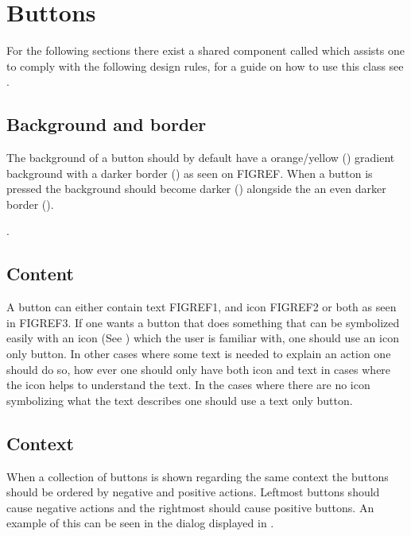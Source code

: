 
\chapter{Buttons}
\label{cha:buttons}

For the following sections there exist a shared component called  which assists one to comply with the following design rules, for a guide on how to use this class see .

\section{Background and border}
\label{sec:button_background_and_border}

The background of a button should by default have a orange/yellow () gradient background with a darker border () as seen on FIGREF. When a button is pressed the background should become darker () alongside the an even darker border ().

. 

\section{Content}
\label{sec:button_content}

A button can either contain text FIGREF1, and icon FIGREF2 or both as seen in FIGREF3. If one wants a button that does something that can be symbolized easily with an icon (See ) which the user is familiar with, one should use an icon only button. In other cases where some text is needed to explain an action one should do so, how ever one should only have both icon and text in cases where the icon helps to understand the text. In the cases where there are no icon symbolizing what the text describes one should use a text only button.


\section{Context}
\label{sec:button_context}

When a collection of buttons is shown regarding the same context the buttons should be ordered by negative and positive actions. Leftmost buttons should cause negative actions and the rightmost should cause positive buttons. An example of this can be seen in the dialog displayed in .